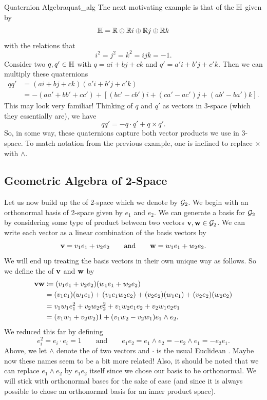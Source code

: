 \begin{ex}{Quaternion Algebra}{quat_alg}
The next motivating example is that of the  $\mathbb{H}$ given by
\[
\mathbb{H} = \mathbb{R} \oplus \mathbb{R} i \oplus \mathbb{R} j \oplus \mathbb{R} k
\]
with the relations that
\[
i^2=j^2=k^2=ijk=-1.
\]
Consider two  $q,q'\in \mathbb{H}$ with $q=ai+bj+ck$ and $q'=a'i+b'j+c'k$.  Then we can multiply these quaternions
\begin{align*}
    qq' &= (ai+bj+ck)(a'i+b'j+c'k)\\
    &= -(aa'+bb'+cc')+\left[(bc'-cb')i+(ca'-ac')j+(ab'-ba')k\right].
\end{align*}
This may look very familiar! Thinking of $q$ and $q'$ as vectors in 3-space (which they essentially are), we have
\[
qq' = -q\cdot q' + q\times q'.
\]
So, in some way, these quaternions capture both vector products we use in 3-space. To match notation from the previous example, one is inclined to replace $\times$ with $\wedge$.
\end{ex}

\subsection{Geometric Algebra of 2-Space}
Let us now build up the  of 2-space which we denote by $\mathcal{G}_2$.  We begin with an orthonormal basis of 2-space given by $e_1$ and $e_2$. We can generate a basis for $\mathcal{G}_2$ by considering some type of product between two vectors $\mathbf{v},\mathbf{w} \in \mathcal{G}_2$. We can write each vector as a linear combination of the basis vectors by
\[
\mathbf{v} = v_1 e_1 + v_2 e_2 \qquad \textrm{and} \qquad \mathbf{w} = w_1 e_1 + w_2 e_2.
\]
We will end up treating the basis vectors in their own unique way as follows. So we define the  of $\mathbf{v}$ and $\mathbf{w}$ by
\begin{align*}
\mathbf{v} \mathbf{w} &\coloneqq (v_1e_1 + v_2 e_2)(w_1 e_1 + w_2 e_2)\\
&= (v_1e_1)(w_1e_1)+(v_1e_1w_2e_2)+(v_2e_2)(w_1e_1)+(v_2e_2)(w_2e_2)\\
&= v_1w_1 e_1^2 + v_2w_2 e_2^2 + v_1w_2 e_1 e_2 + v_2w_1 e_2 e_1\\
&= (v_1w_1+v_2w_2)1 + (v_1 w_2 - v_2w_1)e_1\wedge e_2.
\end{align*}
We reduced this far by defining
\[
e_i^2 = e_i\cdot e_i = 1 \qquad \textrm{and} \qquad e_1e_2 = e_1\wedge e_2 = -e_2\wedge e_1=-e_2 e_1.
\]
Above, we let $\wedge$ denote the  of two vectors and $\cdot$ is the usual Euclidean . Maybe now these names seem to be a bit more related! Also, it should be noted that we can replace $e_1\wedge e_2$ by $e_1e_2$ itself since we chose our basis to be orthonormal. We will stick with orthonormal bases for the sake of ease (and since it is always possible to chose an orthonormal basis for an inner product space).

